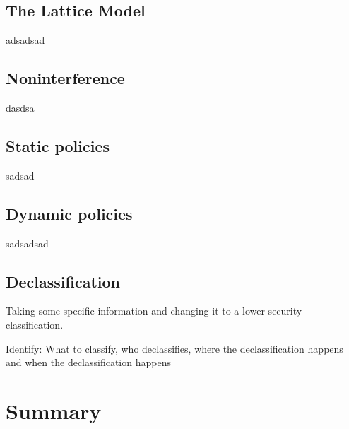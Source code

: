 \subsection{The Lattice Model}
adsadsad

\subsection{Noninterference}
dasdsa

\subsection{Static policies}


sadsad
\subsection{Dynamic policies}
sadsadsad


\subsection{Declassification}
Taking some specific information and changing it to a lower security classification.

Identify: What to classify, who declassifies, where the declassification happens and when the declassification happens

\section{Summary}
